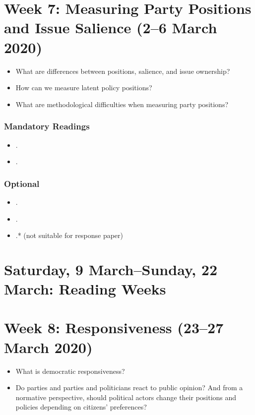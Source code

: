 \documentclass[abstract=on,parskip=full,headings=standardclasses,fontsize=11pt,paper=a4]{scrartcl}
\begin{document}
\section{Week 7:   Measuring Party Positions and Issue Salience (2--6 March 2020)}


\begin{itemize}
\renewcommand\labelitemi{--}
\item What are differences between positions, salience, and issue ownership?
\item How can we measure latent policy positions? 
\item What are methodological difficulties when measuring party positions?
\end{itemize}

\subsubsection*{Mandatory Readings}
\begin{itemize}
\item {}.
\item {}.
\end{itemize}


\subsubsection*{Optional}
\begin{itemize}
\item {}.
\item {}.
\item {}.*  (not suitable for response paper)
\end{itemize}


\section{Saturday, 9 March--Sunday, 22 March: Reading Weeks}


\section{Week 8:  Responsiveness (23--27 March 2020)}

\begin{itemize}
\renewcommand\labelitemi{--}
\item What is democratic responsiveness?
\item Do parties and parties and politicians react to public opinion?  And from a normative perspective, should political actors change their positions and policies depending on citizens' preferences?
\end{itemize}
\end{document}
